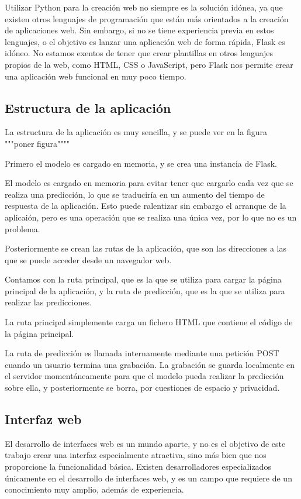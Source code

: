 Utilizar Python para la creación web no siempre es la solución idónea, ya que existen otros lenguajes de programación que están más orientados a la creación de aplicaciones web.
Sin embargo, si no se tiene experiencia previa en estos lenguajes, o el objetivo es lanzar una aplicación web de forma rápida, Flask es idóneo.
No estamos exentos de tener que crear plantillas en otros lenguajes propios de la web, como HTML, CSS o JavaScript, pero Flask nos permite crear una aplicación web funcional en muy poco tiempo.


\subsection{Estructura de la aplicación}
La estructura de la aplicación es muy sencilla, y se puede ver en la figura """poner figura""""

Primero el modelo es cargado en memoria, y se crea una instancia de Flask.

El modelo es cargado en memoria para evitar tener que cargarlo cada vez que se realiza una predicción, lo que se traduciría en un aumento del tiempo de respuesta de la aplicación.
Esto puede ralentizar sin embargo el arranque de la aplicaión, pero es una operación que se realiza una única vez, por lo que no es un problema.

Posteriormente se crean las rutas de la aplicación, que son las direcciones a las que se puede acceder desde un navegador web.

Contamos con la ruta principal, que es la que se utiliza para cargar la página principal de la aplicación, y la ruta de predicción, que es la que se utiliza para realizar las predicciones.

La ruta principal simplemente carga un fichero HTML que contiene el código de la página principal.

La ruta de predicción es llamada internamente mediante una petición POST cuando un usuario termina una grabación.
La grabación se guarda localmente en el servidor momentáneamente para que el modelo pueda realizar la predicción sobre ella, y posteriormente se borra, por cuestiones de espacio y privacidad.



\subsection{Interfaz web}
El desarrollo de interfaces web es un mundo aparte, y no es el objetivo de este trabajo crear una interfaz especialmente atractiva, sino más bien que nos proporcione la funcionalidad básica.
Existen desarrolladores especializados únicamente en el desarrollo de interfaces web, y es un campo que requiere de un conocimiento muy amplio, además de experiencia.

